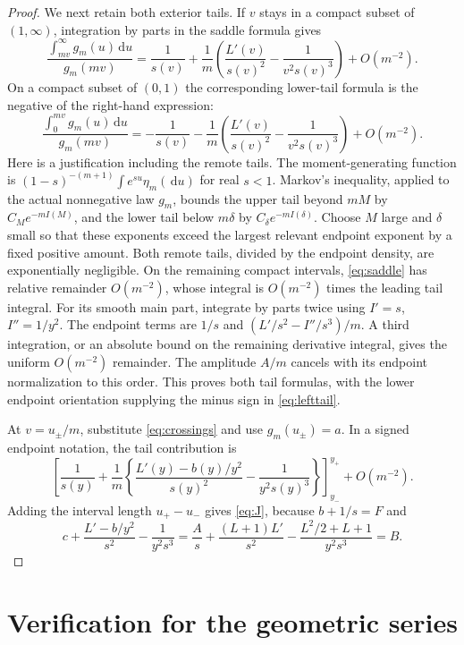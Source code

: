 \documentclass[11pt,oneside]{article}
\theoremstyle{remark}\newtheorem{remark}[theorem]{Remark}
\newcommand{\dd}{\,\mathrm d}
\numberwithin{equation}{section}
\begin{document}
\begin{proof}
We next retain both exterior tails. If $v$ stays in a compact subset of
$(1,\infty)$, integration by parts in the saddle formula gives
\begin{equation}
 \frac{\int_{mv}^{\infty}g_m(u)\dd u}{g_m(mv)}
 =\frac1{s(v)}+\frac1m
   \left(\frac{L'(v)}{s(v)^2}-\frac1{v^2s(v)^3}\right)+O(m^{-2}).
 \label{eq:righttail}
\end{equation}
On a compact subset of $(0,1)$ the corresponding lower-tail formula is
the negative of the right-hand expression:
\begin{equation}
 \frac{\int_0^{mv}g_m(u)\dd u}{g_m(mv)}
 =-\frac1{s(v)}-\frac1m
   \left(\frac{L'(v)}{s(v)^2}-\frac1{v^2s(v)^3}\right)+O(m^{-2}).
 \label{eq:lefttail}
\end{equation}
Here is a justification including the remote tails. The moment-generating
function is $(1-s)^{-(m+1)}\int e^{su}\eta_m(\dd u)$ for real $s<1$.
Markov's inequality, applied to the actual nonnegative law $g_m$, bounds
the upper tail beyond $mM$ by $C_Me^{-mI(M)}$, and the lower tail below
$m\delta$ by $C_\delta e^{-mI(\delta)}$.
Choose $M$ large and $\delta$ small so that these exponents exceed the
largest relevant endpoint exponent by a fixed positive amount. Both remote
tails, divided by the endpoint density, are exponentially negligible.
On the remaining compact intervals, \eqref{eq:saddle} has relative
remainder $O(m^{-2})$, whose integral is $O(m^{-2})$ times the leading
tail integral. For its smooth main part, integrate by parts twice using
$I'=s$, $I''=1/y^2$. The endpoint terms are
$1/s$ and $(L'/s^2-I''/s^3)/m$. A third integration, or an absolute bound
on the remaining derivative integral, gives the uniform $O(m^{-2})$
remainder. The amplitude $A/m$ cancels with its endpoint normalization
to this order. This proves both tail formulas, with the lower endpoint
orientation supplying the minus sign in \eqref{eq:lefttail}.

At $v=u_\pm/m$, substitute \eqref{eq:crossings} and use
$g_m(u_\pm)=a$. In a signed endpoint notation, the tail contribution is
\[
 \left[\frac1{s(y)}+\frac1m\left\{
 \frac{L'(y)-b(y)/y^2}{s(y)^2}-\frac1{y^2s(y)^3}
 \right\}\right]_{y_-}^{y_+}+O(m^{-2}).
\]
Adding the interval length $u_+-u_-$ gives \eqref{eq:J}, because
$b+1/s=F$ and
\[
 c+\frac{L'-b/y^2}{s^2}-\frac1{y^2s^3}
 =\frac A s+\frac{(L+1)L'}{s^2}
                 -\frac{L^2/2+L+1}{y^2s^3}=B.
\]
\end{proof}

\section{Verification for the geometric series}
\end{document}
